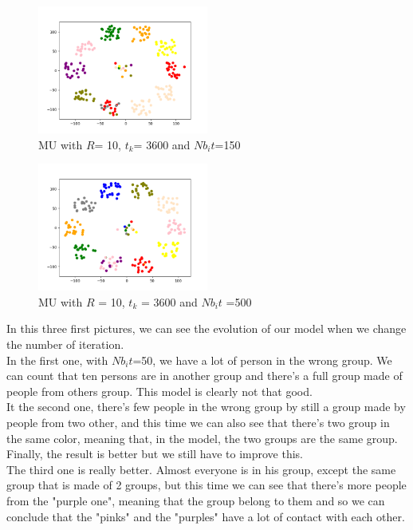 \documentclass{article}
\begin{document}
\begin{figure}[h]
    \centering
    \includegraphics[width=0.5\textwidth]{images/MU150_R10_t3600.png}
    \caption{MU with $R$= 10, $t_{k}$= 3600 and $Nb_it$=150}
\end{figure}

\begin{figure}[h]
    \centering
    \includegraphics[width=0.5\textwidth]{images/MU500_R10_t3600.png}
    \caption{MU with $R$ = 10, $t_{k}$ = 3600 and $Nb_it$ =500}
\end{figure}

In this three first pictures, we can see the evolution of our model when we change the number of iteration.\\

In the first one, with $Nb_it$=50, we have a lot of person in the wrong group. We can count that ten persons are in another group and there's a full group made of people from others group. This model is clearly not that good.\\

It the second one, there's few people in the wrong group by still a group made by people from two other, and this time we can also see that there's two group in the same color, meaning that, in the model, the two groups are the same group. Finally, the result is better but we still have to improve this.\\

The third one is really better. Almost everyone is in his group, except the same group that is made of 2 groups, but this time we can see that there's more people from the "purple one", meaning that the group belong to them and so we can conclude that the "pinks" and the "purples" have a lot of contact with each other.\\
\end{document}
